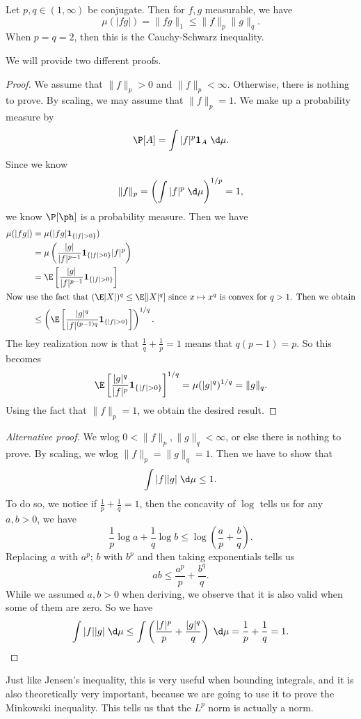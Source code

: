 \documentclass[a4paper]{article}
\begin{document}
\begin{prop}
  Let $p, q \in (1, \infty)$ be conjugate. Then for $f, g$ measurable, we have
  \[
    \mu(|fg|) = \|fg\|_1 \leq \|f\|_p \|g\|_q.
  \]
  When $p = q = 2$, then this is the Cauchy-Schwarz inequality.
\end{prop}

We will provide two different proofs.
\begin{proof}
  We assume that $\|f\|_p > 0$ and $\|f\|_p < \infty$. Otherwise, there is nothing to prove. By scaling, we may assume that $\|f\|_p = 1$. We make up a probability measure by
  \[
    \P[A] = \int |f|^p \mathbf{1}_A \;\d \mu.
  \]
  Since we know
  \[
    \|f\|_p = \left(\int |f|^p\;\d \mu\right)^{1/p} = 1,
  \]
  we know $\P[\ph]$ is a probability measure. Then we have
  \begin{align*}
    \mu(|fg|) &= \mu(|fg| \mathbf{1}_{\{|f| > 0\}})\\
    &= \mu\left(\frac{|g|}{|f|^{p - 1}} \mathbf{1}_{\{|f| > 0\}} |f|^p\right)\\
    &= \E\left[\frac{|g|}{|f|^{p - 1}}\mathbf{1}_{\{|f| > 0\}}\right]\\
    \intertext{Now use the fact that $(\E|X|)^q \leq \E[|X|^q]$ since $x \mapsto x^q$ is convex for $q > 1$. Then we obtain}
    &\leq \left(\E\left[\frac{|g|^q}{|f|^{(p - 1)q}}\mathbf{1}_{\{|f| > 0\}}\right]\right)^{1/q}.
  \end{align*}
  The key realization now is that $\frac{1}{q} + \frac{1}{p} = 1$ means that $q(p - 1) = p$. So this becomes
  \[
    \E\left[\frac{|g|^q}{|f|^p} \mathbf{1}_{\{|f| > 0\}}\right]^{1/q} = \mu(|g|^q)^{1/q} = \|g\|_q.
  \]
  Using the fact that $\|f\|_p = 1$, we obtain the desired result.
\end{proof}

\begin{proof}[Alternative proof]
  We wlog $0 < \|f\|_p, \|g\|_q < \infty$, or else there is nothing to prove. By scaling, we wlog $\|f\|_p = \|g\|_q = 1$. Then we have to show that
  \[
    \int |f||g| \;\d \mu \leq 1.
  \]
  To do so, we notice if $\frac{1}{p} + \frac{1}{q} = 1$, then the concavity of $\log$ tells us for any $a, b > 0$, we have
  \[
    \frac{1}{p} \log a + \frac{1}{q} \log b \leq \log \left(\frac{a}{p} + \frac{b}{q}\right).
  \]
  Replacing $a$ with $a^p$; $b$ with $b^p$ and then taking exponentials tells us
  \[
    a b \leq \frac{a^p}{p} + \frac{b^q}{q}.
  \]
  While we assumed $a, b > 0$ when deriving, we observe that it is also valid when some of them are zero. So we have
  \[
    \int |f||g| \;\d \mu \leq \int \left(\frac{|f|^p}{p} + \frac{|g|^q}{q}\right) \;\d \mu = \frac{1}{p} + \frac{1}{q} = 1.
  \]
\end{proof}
Just like Jensen's inequality, this is very useful when bounding integrals, and it is also theoretically very important, because we are going to use it to prove the Minkowski inequality. This tells us that the $L^p$ norm is actually a norm.
\end{document}
